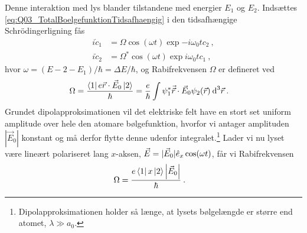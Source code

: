Denne interaktion med lys blander tilstandene med energier $E_1$ og $E_2$. Indsættes \cref{eq:Q03_TotalBoelgefunktionTidsafhaengig} i den tidsafhængige Schrödingerligning fås
\begin{align}
    i\Dot{c}_1 &= \Omega \cos(\omega t) \exp{-i\omega_0 t} c_2 \: , \label{eq:Q03_CoupledDifferentialEquationsForC1AndC2_C1} \\
    i\Dot{c}_2 &= \Omega^* \cos(\omega t) \exp{i\omega_0 t} c_1 \: , \label{eq:Q03_CoupledDifferentialEquationsForC1AndC2_C2}
\end{align}
hvor $\omega = (E-2 - E_1)/\hbar = \Delta E / \hbar$, og \textsf{Rabifrekvensen} $\Omega$ er defineret ved
\begin{align}
    \Omega &= \frac{\bra{1}e\Vec{r}\cdot\Vec{E}_0\ket{2}}{\hbar} = \frac{e}{\hbar} \int \psi_1^* \Vec{\Vec{r}} \cdot \Vec{E}_0 \psi_2(\Vec{r}) \: \text{d}^3\Vec{r} \: .
\end{align}
Grundet \textsf{dipolapproksimationen} vil det elektriske felt have en stort set uniform amplitude over hele den atomare bølgefunktion, hvorfor vi antager amplituden $|\Vec{E}_0|$ konstant og må derfor flytte denne udenfor integralet.\footnote{Dipolapproksimationen holder så længe, at lysets bølgelængde er større end atomet, $\lambda \gg a_0$.} Lader vi nu lyset være lineært polariseret lang $x$-aksen, $\Vec{E} = |\Vec{E}_0|\Hat{e}_x\cos(\omega t)$, får vi Rabifrekvensen
\begin{align}
    \Omega &= \frac{e\bra{1}x\ket{2}\abs{\Vec{E}_0}}{\hbar} \: .
\end{align}


